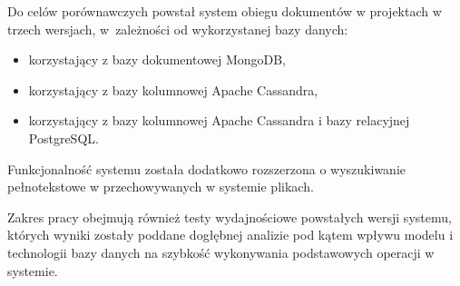 Do celów porównawczych powstał system obiegu dokumentów w projektach w trzech wersjach, w~zależności od wykorzystanej bazy danych:
\begin{itemize}
    \item korzystający z bazy dokumentowej MongoDB,
    \item korzystający z bazy kolumnowej Apache Cassandra,
    \item korzystający z bazy kolumnowej Apache Cassandra i bazy relacyjnej PostgreSQL.
\end{itemize}
Funkcjonalność systemu została dodatkowo rozszerzona o wyszukiwanie pełnotekstowe w przechowywanych w systemie plikach.

Zakres pracy obejmują również testy wydajnościowe powstałych wersji systemu, których wyniki zostały poddane dogłębnej analizie pod kątem wpływu modelu i technologii bazy danych na szybkość wykonywania podstawowych operacji w systemie.